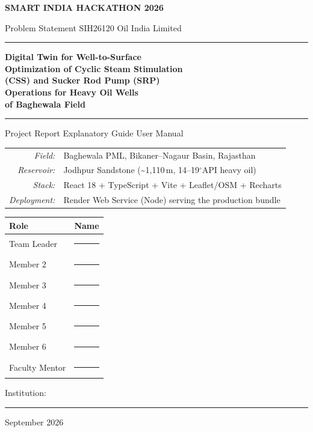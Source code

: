 \documentclass[12pt,a4paper]{report}
\begin{document}
\begin{titlepage}
\centering
{\large\bfseries SMART INDIA HACKATHON 2026\par}
\vspace{4pt}
{\normalsize Problem Statement SIH26120 \textbar{} Oil India Limited\par}
\vspace{14pt}
\rule{\textwidth}{1.2pt}\par\vspace{10pt}
{\Huge\bfseries Digital Twin for Well-to-Surface\\[4pt]
Optimization of Cyclic Steam Stimulation\\[4pt]
(CSS) and Sucker Rod Pump (SRP)\\[4pt]
Operations for Heavy Oil Wells\\[4pt]
of Baghewala Field\par}
\vspace{10pt}
\rule{\textwidth}{1.2pt}\par
\vspace{14pt}
{\Large Project Report \textbar{} Explanatory Guide \textbar{} User Manual\par}
\vspace{22pt}
\begin{tabular}{rl}
\textit{Field:} & Baghewala PML, Bikaner--Nagaur Basin, Rajasthan \\
\textit{Reservoir:} & Jodhpur Sandstone (\textasciitilde1,110\,m, 14--19$^\circ$API heavy oil) \\
\textit{Stack:} & React 18 + TypeScript + Vite + Leaflet/OSM + Recharts \\
\textit{Deployment:} & Render Web Service (Node) serving the production bundle \\
\end{tabular}
\vspace{24pt}

\begin{center}
\begin{tabular}{p{5.5cm}p{7.5cm}}
\toprule
\textbf{Role} & \textbf{Name} \\
\midrule
Team Leader & \rule{6.5cm}{0.4pt} \\
Member 2 & \rule{6.5cm}{0.4pt} \\
Member 3 & \rule{6.5cm}{0.4pt} \\
Member 4 & \rule{6.5cm}{0.4pt} \\
Member 5 & \rule{6.5cm}{0.4pt} \\
Member 6 & \rule{6.5cm}{0.4pt} \\
Faculty Mentor & \rule{6.5cm}{0.4pt} \\
\bottomrule
\end{tabular}
\end{center}
\vspace{18pt}
{\large Institution: \rule{8cm}{0.4pt}\par}
\vspace{6pt}
{\large September 2026\par}
\end{titlepage}
\end{document}
